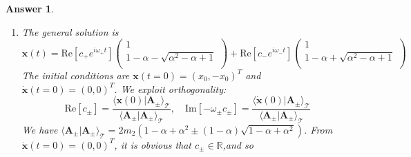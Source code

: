 \documentclass[a4paper]{article}
\newtheorem{ans}{Answer}[section]
\theoremstyle{new}
\begin{document}
\begin{ans}
\begin{enumerate}[label=(\roman*)]
$$\frac{m_1}{k}\omega^2=(\alpha+1)\pm\sqrt{\alpha^2-\alpha+1}, \quad \frac{m_2}{k}\omega^2=1+\alpha^{-1}\pm\sqrt{\alpha^{-2}-\alpha^{-1}+1}$$
Let the eigenvector be $(a,b)^T$, then the first line of $(\mathcal{V}-\omega^2\mathcal{T})$ gives $$(2k-m_1\omega_+^2)a-kb=0\implies b=a(1-\alpha\pm\sqrt{\alpha^2-\alpha+1})$$ The normal modes are the unnormalized eigenvectors are $\mathbf{A_\pm}=(1,1-\alpha\pm\sqrt{\alpha^2-\alpha+1})^T$. Verify that these eigenvectors are orthogonal with respect to $\mathcal{T}$:
\begin{align}
\langle\mathbf{A_-}|\mathbf{A_+}\rangle_{\mathcal{T}}&=\begin{pmatrix}1&1-\alpha-\sqrt{\alpha^2-\alpha+1}\\\end{pmatrix}\begin{pmatrix}\alpha&0\\0&1\\\end{pmatrix}\begin{pmatrix}1\\1-\alpha+\sqrt{\alpha^2-\alpha+1}\\\end{pmatrix}\nonumber\\&=\alpha+(1-\alpha)^2-(\alpha^2-\alpha+1)\nonumber\\&=0\nonumber
\end{align}
\item The general solution is
$$\mathbf{x}(t)=\text{Re}[c_+e^{i\omega_+t}]\begin{pmatrix}1\\1-\alpha-\sqrt{\alpha^2-\alpha+1}\\\end{pmatrix}+\text{Re}[c_-e^{i\omega_-t}]\begin{pmatrix}1\\1-\alpha+\sqrt{\alpha^2-\alpha+1}\\\end{pmatrix}$$
The initial conditions are $\mathbf{x}(t=0)=(x_0,-x_0)^T$ and $\mathbf{\dot{x}}(t=0)=(0,0)^T$. We exploit orthogonality:
\begin{equation}
  \text{Re}[c_\pm]=\frac{\langle\mathbf{x}(0)|\mathbf{A_\pm}\rangle_{\mathcal{T}}}{\langle\mathbf{A_\pm}|\mathbf{A_\pm}\rangle_{\mathcal{T}}},\quad \text{Im}[-\omega_\pm c_\pm]=\frac{\langle\mathbf{\dot{x}}(0)|\mathbf{A_\pm}\rangle_{\mathcal{T}}}{\langle\mathbf{A_\pm}|\mathbf{A_\pm}\rangle_\mathcal{T}}\nonumber
\end{equation}
We have $\langle\mathbf{A}_\pm|\mathbf{A}_\pm\rangle_{\mathcal{T}}=2m_2(1-\alpha+\alpha^2\pm(1-\alpha)\sqrt{1-\alpha+\alpha^2})$. From $\mathbf{\dot{x}}(t=0)=(0,0)^T$, it is obvious that $c_\pm\in\mathbb{R}$,and so

\end{enumerate}
\end{ans}
\end{document}
